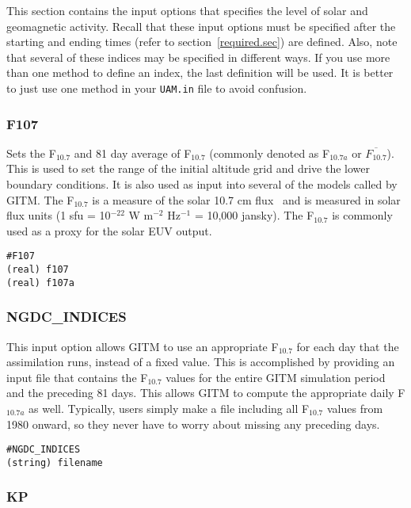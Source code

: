 This section contains the input options that specifies the level of solar and geomagnetic activity.  Recall that these input options must be specified after the starting and ending times (refer to section~\ref{required.sec}) are defined.  Also, note that several of these indices may be specified in different ways.  If you use more than one method to define an index, the last definition will be used.  It is better to just use one method in your {\tt UAM.in} file to avoid confusion.

\subsubsection{F107}
\label{f107.sec}

Sets the F$_{10.7}$ and 81 day average of F$_{10.7}$ (commonly denoted as F$_{10.7a}$ or $\overline{F_{10.7}}$).  This is used to set the range of the initial altitude grid and drive the lower boundary conditions.  It is also used as input into several of the models called by GITM.  The F$_{10.7}$ is a measure of the solar 10.7 cm flux~\citep{Covington:1948aa} and is measured in solar flux units (1 sfu = 10$^{-22}$ W m$^{-2}$ Hz$^{-1}$ = 10,000 jansky).  The F$_{10.7}$ is commonly used as a proxy for the solar EUV output.  

\begin{verbatim}
#F107
(real) f107
(real) f107a
\end{verbatim}

\subsubsection{NGDC\_INDICES}
\label{ngdc_indices.sec}

This input option allows GITM to use an appropriate F$_{10.7}$ for each day that the assimilation runs, instead of a fixed value.  This is accomplished by providing an input file that contains the F$_{10.7}$ values for the entire GITM simulation period and the preceding 81 days.  This allows GITM to compute the appropriate daily F$_{10.7a}$ as well.  Typically, users simply make a file including all F$_{10.7}$ values from 1980 onward, so they never have to worry about missing any preceding days.

\begin{verbatim}
#NGDC_INDICES
(string) filename
\end{verbatim}

\subsubsection{KP}
\label{kp.sec}

